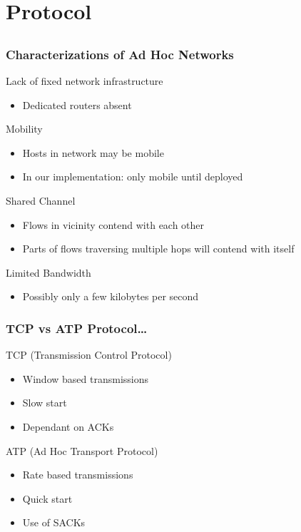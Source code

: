\section{Protocol}
\subsection*{}

\begin{frame}[t]
  \frametitle{Characterizations of Ad Hoc Networks}
  
  Lack of fixed network infrastructure
  \begin{itemize}
  \item Dedicated routers absent
  \end{itemize}

  \vfill
  
  Mobility
  \begin{itemize}
  \item Hosts in network may be mobile
  \item In our implementation: only mobile until deployed
  \end{itemize}

  \vfill

  Shared Channel
  \begin{itemize}
  \item Flows in vicinity contend with each other
  \item Parts of flows traversing multiple hops will contend with itself
  \end{itemize}

  \vfill

  Limited Bandwidth
  \begin{itemize}
  \item Possibly only a few kilobytes per second
  \end{itemize}

  \vfill
  
\end{frame}

\begin{frame}[t]
  \frametitle{TCP vs ATP Protocol\dots}

  TCP (Transmission Control Protocol)
  \begin{itemize}
  \item Window based transmissions
  \item Slow start
  \item Dependant on ACKs
  \end{itemize}

  \vfill

  ATP (Ad Hoc Transport Protocol)
  \begin{itemize}
  \item Rate based transmissions
  \item Quick start
  \item Use of SACKs
  \end{itemize}

  
\end{frame}

